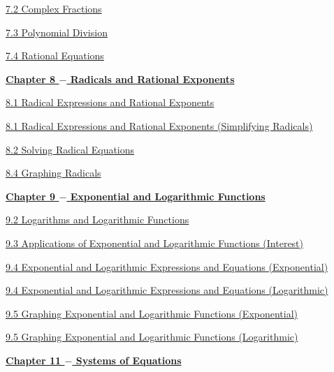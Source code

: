 \documentclass[lang=en,11pt]{elegantbook}
\begin{document}
\href{https://cdn.kutasoftware.com/Worksheets/Alg2/Complex%20Fractions.pdf}{7.2   Complex Fractions}

\href{https://cdn.kutasoftware.com/Worksheets/Alg1/Dividing%20Polynomials.pdf}{7.3   Polynomial Division}

\href{https://cdn.kutasoftware.com/Worksheets/Alg1/Solving%20Rational%20Equations%202.pdf}{7.4   Rational Equations} 

\noindent \underline{\textbf{Chapter 8 $-$ Radicals and Rational Exponents}}

\href{https://cdn.kutasoftware.com/Worksheets/Alg2/Radicals%20and%20Rational%20Exponents.pdf}{8.1   Radical Expressions and Rational Exponents}

\href{https://cdn.kutasoftware.com/Worksheets/Alg2/Simplifying%20Radicals.pdf}{8.1   Radical Expressions and Rational Exponents (Simplifying Radicals)}

\href{https://cdn.kutasoftware.com/Worksheets/Alg2/Square%20Root%20Equations.pdf}{8.2   Solving Radical Equations}

\href{https://cdn.kutasoftware.com/Worksheets/Alg2/Graphing%20Radicals.pdf}{8.4   Graphing Radicals}

\noindent \underline{\textbf{Chapter 9 $-$ Exponential and Logarithmic Functions}}

\href{https://cdn.kutasoftware.com/Worksheets/Precalc/03%20-%20Properties%20of%20Logarithms.pdf}{9.2   Logarithms and Logarithmic Functions}

\href{https://cdn.kutasoftware.com/Worksheets/Precalc/03%20-%20Compound%20Interest.pdf}{9.3   Applications of Exponential and Logarithmic Functions (Interest)}

\href{https://cdn.kutasoftware.com/Worksheets/Alg2/Solving%20Exponential%20Equations%20with%20Logarithms.pdf}{9.4   Exponential and Logarithmic Expressions and Equations (Exponential)}

\href{https://cdn.kutasoftware.com/Worksheets/Alg2/Logarithmic%20Equations.pdf}{9.4   Exponential and Logarithmic Expressions and Equations (Logarithmic)}

\href{https://cdn.kutasoftware.com/Worksheets/Alg2/Graphing%20Exponential%20Functions.pdf}{9.5   Graphing Exponential and Logarithmic Functions (Exponential)}

\href{https://cdn.kutasoftware.com/Worksheets/Alg2/Graphing%20Logarithms.pdf}{9.5   Graphing Exponential and Logarithmic Functions (Logarithmic)}

\noindent \underline{\textbf{Chapter 11 $-$ Systems of Equations}}
\end{document}
